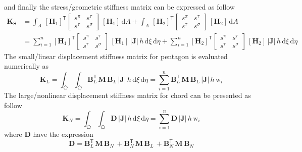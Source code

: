 and finally the stress/geometric stiffness matrix can be expressed as follow
\begin{equation}
\begin{aligned}
\mathbf{K_{\mathbf{S}}} & =  \int_A \, [\mathbf{H}_1]^{\mathsf{T}}  \begin{bmatrix} s^{\pi} & s^{\tau} \\ 
s^{\tau} & s^{\sigma}
\end{bmatrix} \, [\mathbf{H}_1] \, \mathrm{d} A + \int_A \, [\mathbf{H}_2]^{\mathsf{T}}  \begin{bmatrix} s^{\pi} & s^{\tau} \\ 
s^{\tau} & s^{\sigma} 
\end{bmatrix} \, [\mathbf{H}_2] \, \mathrm{d} A\\
& =  \sum_{i=1}^{n} [\mathbf{H}_1]^{\mathsf{T}}  \begin{bmatrix} s^{\pi} & s^{\tau} \\ 
s^{\tau} & s^{\sigma}
\end{bmatrix} \, [\mathbf{H}_1] \, |\mathbf{J}| \, h \,  \mathrm{d} \xi \,  \mathrm{d} \eta + \sum_{i=1}^{n} [\mathbf{H}_2]^{\mathsf{T}}  \begin{bmatrix} s^{\pi} & s^{\tau} \\ 
s^{\tau} & s^{\sigma}
\end{bmatrix} \, [\mathbf{H}_2] \, |\mathbf{J}| \, h \,  \mathrm{d} \xi \,  \mathrm{d} \eta
\end{aligned}
\end{equation}
The small/linear displacement stiffness matrix for pentagon is evaluated numerically as 
\begin{equation}
\mathbf{K}_{L} = \int_{\pentagon} \int_{\pentagon} \mathbf{B}_L^{\mathsf{T}} \, \mathbf{M} \, \mathbf{B}_L \, |\mathbf{J}| \, h \,  \mathrm{d} \xi \,  \mathrm{d} \eta =  \sum_{i=1}^{n}  \mathbf{B}_L^{\mathsf{T}} \, \mathbf{M} \, \mathbf{B}_L \, |\mathbf{J}|  \, h \, \mathrm{w}_i
\end{equation}
The large/nonlinear displacement stiffness matrix for chord can be presented as follow
\begin{equation}
\mathbf{K}_{N} = \int_{\pentagon} \int_{\pentagon} \mathbf{D} \, |\mathbf{J}|\, h \, \mathrm{d} \xi \, \mathrm{d} \eta 
= \sum_{i=1}^{n}  \mathbf{D} \, |\mathbf{J}| \, h \, \mathrm{w}_i
\end{equation}
where $\mathbf{D}$ have the expression 
\begin{equation}
\mathbf{D} = \mathbf{B}_L^{\mathsf{T}} \, \mathbf{M} \, \mathbf{B}_N \, + \mathbf{B}_N^{\mathsf{T}} \, \mathbf{M} \, \mathbf{B}_L \, + \mathbf{B}_N^{\mathsf{T}} \, \mathbf{M} \, \mathbf{B}_N
\end{equation}

